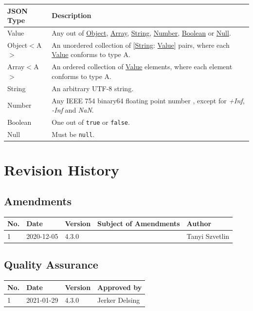 \documentclass[a4paper]{arrowhead}
\newcommand{\pdef}[1]{{\textcolor{ArrowheadGrey}{#1\label{sec:model:primitives:#1}\label{sec:model:primitives:#1s}\label{sec:model:primitives:#1es}}}}
\newcommand{\pref}[1]{{\textcolor{ArrowheadGrey}{\hyperref[sec:model:primitives:#1]{#1}}}}
\begin{document}
\begin{table}[ht!]
\begin{tabularx}{\textwidth}{| p{3cm} | X |} \hline
\rowcolor{gray!33} JSON Type & Description \\ \hline
\pdef{Value}                 & Any out of \pref{Object}, \pref{Array}, \pref{String}, \pref{Number}, \pref{Boolean} or \pref{Null}. \\ \hline
\pdef{Object}$<$A$>$         & An unordered collection of $[$\pref{String}: \pref{Value}$]$ pairs, where each \pref{Value} conforms to type A. \\ \hline
\pdef{Array}$<$A$>$          & An ordered collection of \pref{Value} elements, where each element conforms to type A. \\ \hline
\pdef{String}                & An arbitrary UTF-8 string. \\ \hline
\pdef{Number}                & Any IEEE 754 binary64 floating point number \cite{cowlishaw2019floating}, except for \textit{+Inf}, \textit{-Inf} and \textit{NaN}. \\ \hline
\pdef{Boolean}               & One out of \texttt{true} or \texttt{false}. \\ \hline
\pdef{Null}                  & Must be \texttt{null}. \\ \hline
\end{tabularx}
\end{table}

\newpage




\newpage

\section{Revision History}
\subsection{Amendments}

\noindent\begin{tabularx}{\textwidth}{| p{1cm} | p{3cm} | p{2cm} | X | p{4cm} |} \hline
\rowcolor{gray!33} No. & Date & Version & Subject of Amendments & Author \\ \hline

1 & 2020-12-05 & 4.3.0 & & Tanyi Szvetlin \\ \hline

\end{tabularx}

\subsection{Quality Assurance}

\noindent\begin{tabularx}{\textwidth}{| p{1cm} | p{3cm} | p{2cm} | X |} \hline
\rowcolor{gray!33} No. & Date & Version & Approved by \\ \hline

1 & 2021-01-29 & 4.3.0 & Jerker Delsing\\ \hline

\end{tabularx}
\end{document}
